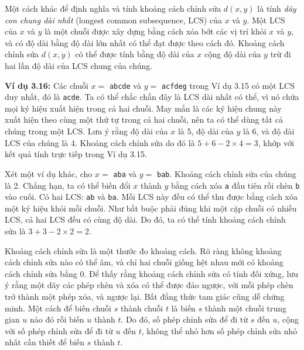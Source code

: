 Một cách khác để định nghĩa và tính khoảng cách chỉnh sửa $d(x,y)$ là tính \emph{dãy con chung dài nhất} (longest common subsequence, LCS) của $x$ và $y$. Một LCS của $x$ và $y$ là một chuỗi được xây dựng bằng cách xóa bớt các vị trí khỏi $x$ và $y$, và có độ dài bằng độ dài lớn nhất có thể đạt được theo cách đó. Khoảng cách chỉnh sửa $d(x,y)$ có thể được tính bằng độ dài của $x$ cộng độ dài của $y$ trừ đi hai lần độ dài của LCS chung của chúng.

\textbf{Ví dụ 3.16:} Các chuỗi $x = $ \texttt{abcde} và $y = $ \texttt{acfdeg} trong Ví dụ 3.15 có một LCS duy nhất, đó là \texttt{acde}. Ta có thể chắc chắn đây là LCS dài nhất có thể, vì nó chứa mọi ký hiệu xuất hiện trong cả hai chuỗi. May mắn là các ký hiệu chung này xuất hiện theo cùng một thứ tự trong cả hai chuỗi, nên ta có thể dùng tất cả chúng trong một LCS. Lưu ý rằng độ dài của $x$ là 5, độ dài của $y$ là 6, và độ dài LCS của chúng là 4. Khoảng cách chỉnh sửa do đó là $5+6-2\times4=3$, khớp với kết quả tính trực tiếp trong Ví dụ 3.15.

Xét một ví dụ khác, cho $x = $ \texttt{aba} và $y = $ \texttt{bab}. Khoảng cách chỉnh sửa của chúng là 2. Chẳng hạn, ta có thể biến đổi $x$ thành $y$ bằng cách xóa \texttt{a} đầu tiên rồi chèn \texttt{b} vào cuối. Có hai LCS: \texttt{ab} và \texttt{ba}. Mỗi LCS này đều có thể thu được bằng cách xóa một ký hiệu khỏi mỗi chuỗi. Như bắt buộc phải đúng khi một cặp chuỗi có nhiều LCS, cả hai LCS đều có cùng độ dài. Do đó, ta có thể tính khoảng cách chỉnh sửa là $3+3-2\times2=2$.

Khoảng cách chỉnh sửa là một thước đo khoảng cách. Rõ ràng không khoảng cách chỉnh sửa nào có thể âm, và chỉ hai chuỗi giống hệt nhau mới có khoảng cách chỉnh sửa bằng 0. Để thấy rằng khoảng cách chỉnh sửa có tính đối xứng, lưu ý rằng một dãy các phép chèn và xóa có thể được đảo ngược, với mỗi phép chèn trở thành một phép xóa, và ngược lại. Bất đẳng thức tam giác cũng dễ chứng minh. Một cách để biến chuỗi $s$ thành chuỗi $t$ là biến $s$ thành một chuỗi trung gian $u$ nào đó rồi biến $u$ thành $t$. Do đó, số phép chỉnh sửa để đi từ $s$ đến $u$, cộng với số phép chỉnh sửa để đi từ $u$ đến $t$, không thể nhỏ hơn số phép chỉnh sửa nhỏ nhất cần thiết để biến $s$ thành $t$.

